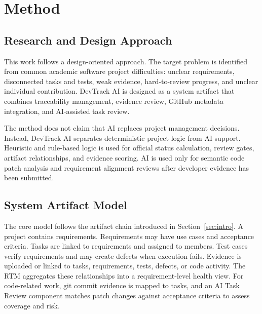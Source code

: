 \section{Method}

\subsection{Research and Design Approach}

This work follows a design-oriented approach. The target problem is identified from
common academic software project difficulties: unclear requirements, disconnected
tasks and tests, weak evidence, hard-to-review progress, and unclear individual
contribution. DevTrack AI is designed as a system artifact that combines
traceability management, evidence review, GitHub metadata integration, and
AI-assisted task review.

The method does not claim that AI replaces project management decisions. Instead,
DevTrack AI separates deterministic project logic from AI support. Heuristic and rule-based
logic is used for official status calculation, review gates, artifact relationships,
and evidence scoring. AI is used only for semantic code patch analysis and requirement
alignment reviews after developer evidence has been submitted.

\subsection{System Artifact Model}

The core model follows the artifact chain introduced in Section~\ref{sec:intro}. A project contains
requirements. Requirements may have use cases and acceptance criteria. Tasks are
linked to requirements and assigned to members. Test cases verify requirements and
may create defects when execution fails. Evidence is uploaded or linked to tasks,
requirements, tests, defects, or code activity. The RTM aggregates these
relationships into a requirement-level health view. For code-related work, git commit
evidence is mapped to tasks, and an AI Task Review component matches patch changes
against acceptance criteria to assess coverage and risk.

